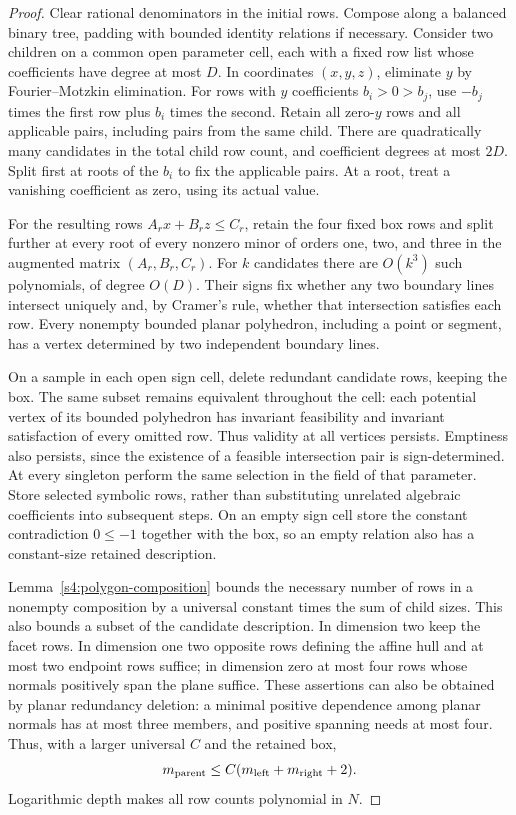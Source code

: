 \begin{proof}
Clear rational denominators in the initial rows. Compose along a balanced
binary tree, padding with bounded identity relations if necessary.
Consider two children on a common open parameter cell, each with a fixed
row list whose coefficients have degree at most $D$. In coordinates
$(x,y,z)$, eliminate $y$ by Fourier--Motzkin elimination. For rows with
$y$ coefficients $b_i>0>b_j$, use $-b_j$ times the first row plus $b_i$
times the second. Retain all zero-$y$ rows and all applicable pairs,
including pairs from the same child. There are quadratically many
candidates in the total child row count, and coefficient degrees at most
$2D$. Split first at roots of the $b_i$ to fix the applicable pairs.
At a root, treat a vanishing coefficient as zero, using its actual value.

For the resulting rows $A_rx+B_rz\le C_r$, retain the four fixed box
rows and split further at every root of every nonzero minor of orders
one, two, and three in the augmented matrix $(A_r,B_r,C_r)$. For $k$
candidates there are $O(k^3)$ such polynomials, of degree $O(D)$.
Their signs fix whether any two boundary lines intersect uniquely and,
by Cramer's rule, whether that intersection satisfies each row. Every
nonempty bounded planar polyhedron, including a point or segment, has
a vertex determined by two independent boundary lines.

On a sample in each open sign cell, delete redundant candidate rows,
keeping the box. The same subset remains equivalent throughout the
cell: each potential vertex of its bounded polyhedron has invariant
feasibility and invariant satisfaction of every omitted row. Thus
validity at all vertices persists. Emptiness also persists, since the
existence of a feasible intersection pair is sign-determined. At every
singleton perform the same selection in the field of that parameter.
Store selected symbolic rows, rather than substituting unrelated
algebraic coefficients into subsequent steps. On an empty sign cell
store the constant contradiction $0\le-1$ together with the box,
so an empty relation also has a constant-size retained description.

Lemma~\ref{s4:polygon-composition} bounds the necessary number of rows
in a nonempty composition by a universal constant times the sum of
child sizes. This also bounds a subset of the candidate description.
In dimension two keep the facet rows. In dimension one two opposite
rows defining the affine hull and at most two endpoint rows suffice;
in dimension zero at most four rows whose normals positively span the
plane suffice. These assertions can also be obtained by planar
redundancy deletion: a minimal positive dependence among planar normals
has at most three members, and positive spanning needs at most four.
Thus, with a larger universal $C$ and the retained box,
\[
 m_{\rm parent}\le C(m_{\rm left}+m_{\rm right}+2).
\]
Logarithmic depth makes all row counts polynomial in $N$.


\end{proof}
